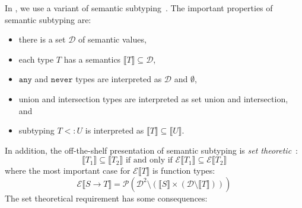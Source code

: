 \documentclass[acmsmall,review,screen]{acmart}
\newcommand{\NEVER}{\mathtt{never}}
\newcommand{\ANY}{\mathtt{any}}
\newcommand{\fun}{\mathbin{\rightarrow}}
\newcommand{\sem}[1]{\llbracket{#1}\rrbracket}
\newcommand{\Val}{\mathcal{D}}
\begin{document}
In , we use a variant of semantic
subtyping~\cite{GF05:GentleIntroduction,FCB08:SemanticSubtyping,Ken21:DownDirty}. The
important properties of semantic subtyping are:
\begin{itemize}
\item there is a set $\Val$ of semantic values,
\item each type $T$ has a semantics $\sem{T} \subseteq \Val$,
\item $\ANY$ and $\NEVER$ types are interpreted as $\Val$ and $\emptyset$,
\item union and intersection types are interpreted as set union and intersection, and
\item subtyping $T <: U$ is interpreted as $\sem{T} \subseteq \sem{U}$.
\end{itemize}
In addition, the off-the-shelf presentation of semantic subtyping is \emph{set theoretic}~\cite[\S2.5]{GF05:GentleIntroduction}:
\[
  \sem{T_1} \subseteq \sem{T_2} \mbox{ if and only if }
  \mathcal{E}\sem{T_1} \subseteq \mathcal{E}\sem{T_2}
\]
where the most important case for $\mathcal{E}\sem{T}$ is function types:
\[
  \mathcal{E}\sem{S \fun T} = \mathcal{P}(\Val^2 \setminus (\sem{S} \times (\Val \setminus \sem{T})))
\]
The set theoretical requirement has some consequences:
\end{document}
